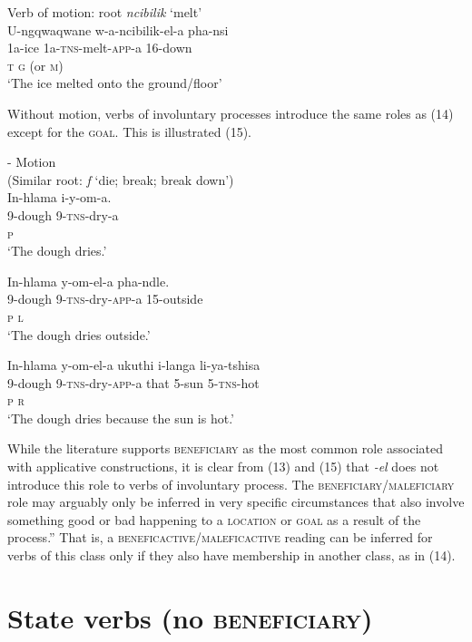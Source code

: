 \documentclass[output=paper]{langsci/langscibook}
\begin{document}
\ea
{Verb of motion: root \textit{ncibilik} ‘melt’}\\
\gll U-ngqwaqwane w-a-ncibilik-el-a pha-nsi\\
 1a-ice 1a-\textsc{tns}-melt-\textsc{app}-a 16-down \\
 \textsc{t g} (or \textsc{m})\\
\glt ‘The ice melted onto the ground/floor’
\z

 Without motion, verbs of involuntary processes introduce the same roles as (14) except for the \textsc{goal. }This is illustrated (15).

\ea
{- Motion }\\
 (Similar root: \textit{f} ‘die; break; break down’)\\
\ea
\gll In-hlama i-y-om-a. \\
 9-dough 9-\textsc{tns}-dry-a \\
 \textsc{p }\\
\glt ‘The dough dries.’


\ex
\gll In-hlama y-om-el-a pha-ndle. \\
 9-dough 9-\textsc{tns}-dry-\textsc{app}-a 15-outside \\
 \textsc{p l}\\
\glt ‘The dough dries outside.’

\ex
\gll In-hlama y-om-el-a ukuthi i-langa li-ya-tshisa \\
 9-dough 9-\textsc{tns}-dry-\textsc{app}-a that 5-sun 5-\textsc{tns}-hot\\
 \textsc{p r}\\
\glt ‘The dough dries because the sun is hot.’ 
\z
\z

While the literature supports \textsc{beneficiary} as the most common role associated with applicative constructions, it is clear from (13) and (15) that \textit{-el} does not introduce this role to verbs of involuntary process. The \textsc{beneficiary}/\textsc{maleficiary} role may arguably only be inferred in very specific circumstances that also involve something good or bad happening to a \textsc{location} or \textsc{goal} as a result of the process.” That is, a \textsc{beneficactive}/\textsc{maleficactive} reading can be inferred for verbs of this class only if they also have membership in another class, as in (14).

\section{State verbs (no \textsc{beneficiary)}}
\end{document}
